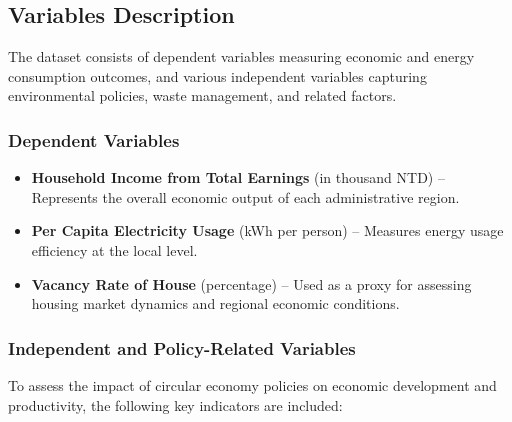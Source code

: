 \documentclass{article}
\begin{document}
\subsection{Variables Description}
The dataset consists of dependent variables measuring economic and energy consumption outcomes, and various independent variables capturing environmental policies, waste management, and related factors.

\subsubsection{Dependent Variables}
\begin{itemize}
    \item \textbf{Household Income from Total Earnings} (in thousand NTD) – Represents the overall economic output of each administrative region.
    \item \textbf{Per Capita Electricity Usage} (kWh per person) – Measures energy usage efficiency at the local level.
    \item \textbf{Vacancy Rate of House} (percentage) – Used as a proxy for assessing housing market dynamics and regional economic conditions.
\end{itemize}

\subsubsection{Independent and Policy-Related Variables}
To assess the impact of circular economy policies on economic development and productivity, the following key indicators are included:
\end{document}
